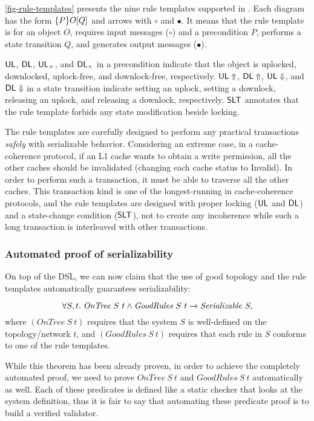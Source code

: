 \autoref{fig-rule-templates} presents the nine rule templates supported in \hemiola{}.
Each diagram has the form $\{P\}O\lbrack Q\rbrack$ and arrows with $\circ$ and $\bullet$.
It means that the rule template is for an object $O$, requires input messages ($\circ$) and a precondition $P$, performs a state transition $Q$, and generates output messages ($\bullet$).

$\textsf{UL}$, $\textsf{DL}$, $\textsf{UL}_{\times}$, and $\textsf{DL}_{\times}$ in a precondition indicate that the object is uplocked, downlocked, uplock-free, and downlock-free, respectively.
$\textsf{UL}\Uparrow$, $\textsf{DL}\Uparrow$, $\textsf{UL}\Downarrow$, and $\textsf{DL}\Downarrow$ in a state transition indicate setting an uplock, setting a downlock, releasing an uplock, and releasing a downlock, respectively.
$\textsf{SLT}{}$ annotates that the rule template forbids any state modification beside locking.

The rule templates are carefully designed to perform any practical transactions \emph{safely} with serializable behavior.
Considering an extreme case, in a cache-coherence protocol, if an L1 cache wants to obtain a write permission, all the other caches should be invalidated (changing each cache status to Invalid).
In order to perform such a transaction, it must be able to traverse all the other caches.
This transaction kind is one of the longest-running in cache-coherence protocols, and the rule templates are designed with proper locking ($\textsf{UL}$ and $\textsf{DL}$) and a state-change condition ($\textsf{SLT}$), not to create any incoherence while such a long transaction is interleaved with other transactions.

\subsubsection{Automated proof of serializability}

\newcommand{\ontree}[2]{\ensuremath{\textit{OnTree}\ #1\ #2}}
\newcommand{\goodrules}[2]{\ensuremath{\textit{GoodRules}\ #1\ #2}}

On top of the \hemiola{} DSL, we can now claim that the use of good topology and the rule templates automatically guarantees serializability:
\begin{theorem}
  \begin{displaymath}
    \forall S, t.\; \ontree{S}{t} \land \goodrules{S}{t} \to \hsrz{S},
  \end{displaymath}
  where $(\ontree{S}{t})$ requires that the system $S$ is well-defined on the topology/network $t$, and $(\goodrules{S}{t})$ requires that each rule in $S$ conforms to one of the rule templates.
  \label{thm-sz-guarantee}
\end{theorem}
While this theorem has been already proven, in order to achieve the completely automated proof, we need to prove \ontree{S}{t} and \goodrules{S}{t} automatically as well.
Each of these predicates is defined like a static checker that looks at the system definition, thus it is fair to say that automating these predicate proof is to build a verified validator.

